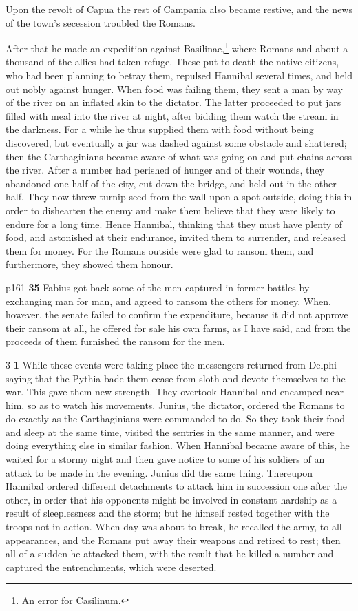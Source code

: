 Upon the revolt of Capua the rest of Campania also became restive, and the news of the town's secession troubled the Romans.

After that he made an expedition against Basilinae,\texthebrew{⁠}\footnote{An error for Casilinum.

} where Romans and about a thousand of the allies had taken refuge. These put to death the native citizens, who had been planning to betray them, repulsed Hannibal several times, and held out nobly against hunger. When food was failing them, they sent a man by way of the river on an inflated skin to the dictator. The latter proceeded to put jars filled with meal into the river at night, after bidding them watch the stream in the darkness. For a while he thus supplied them with food without being discovered, but eventually a jar was dashed against some obstacle and shattered; then the Carthaginians became aware of what was going on and put chains across the river. After a number had perished of hunger and of their wounds, they abandoned one half of the city, cut down the bridge, and held out in the other half. They now threw turnip seed from the wall upon a spot outside, doing this in order to dishearten the enemy and make them believe that they were likely to endure for a long time. Hence Hannibal, thinking that they must have plenty of food, and astonished at their endurance, invited them to surrender, and released them for money. For the Romans outside were glad to ransom them, and furthermore, they showed them honour.

p161
\textbf{35}
Fabius got back some of the men captured in former battles by exchanging man for man, and agreed to ransom the others for money. When, however, the senate failed to confirm the expenditure, because it did not approve their ransom at all, he offered for sale his own farms, as I have said, and from the proceeds of them furnished the ransom for the men.

3 \textbf{1} While these events were taking place the messengers returned from Delphi saying that the Pythia bade them cease from sloth and devote themselves to the war. This gave them new strength. They overtook Hannibal and encamped near him, so as to watch his movements. Junius, the dictator, ordered the Romans to do exactly as the Carthaginians were commanded to do. So they took their food and sleep at the same time, visited the sentries in the same manner, and were doing everything else in similar fashion. When Hannibal became aware of this, he waited for a stormy night and then gave notice to some of his soldiers of an attack to be made in the evening. Junius did the same thing. Thereupon Hannibal ordered different detachments to attack him in succession one after the other, in order that his opponents might be involved in constant hardship as a result of sleeplessness and the storm; but he himself rested together with the troops not in action. When day was about to break, he recalled the army, to all appearances, and the Romans put away their weapons and retired to rest; then all of a sudden he attacked them, with the result that he killed a number and captured the entrenchments, which were deserted.

